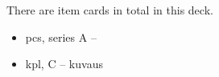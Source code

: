 There are  item cards in total in this deck. %

\small{
\begin{itemize}
	\item {} pcs, series A -- \descriptionA
	\item {} kpl, C -- kuvaus
\end{itemize}
}
\newpage